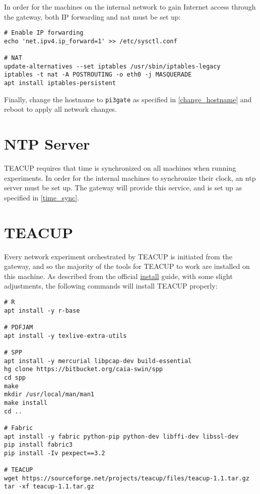 In order for the machines on the internal network to gain Internet access through the gateway, both IP forwarding and \gls{nat} must be set up:

\begin{lstlisting}
# Enable IP forwarding
echo 'net.ipv4.ip_forward=1' >> /etc/sysctl.conf

# NAT
update-alternatives --set iptables /usr/sbin/iptables-legacy
iptables -t nat -A POSTROUTING -o eth0 -j MASQUERADE
apt install iptables-persistent
\end{lstlisting}

Finally, change the hostname to \lstinline{pi3gate} as specified in \ref{change_hostname} and reboot to apply all network changes.


\section{NTP Server}

TEACUP requires that time is synchronized on all machines when running experiments. In order for the internal machines to synchronize their clock, an \gls{ntp} server must be set up. The gateway will provide this service, and is set up as specified in \ref{time_sync}.


\section{TEACUP} \label{teacup_gateway}

Every network experiment orchestrated by TEACUP is initiated from the gateway, and so the majority of the tools for TEACUP to work are installed on this machine. As described from the official \href{http://caia.swin.edu.au/tools/teacup/TEACUP-0.9_INSTALL.txt}{install} guide, with some slight adjustments, the following commands will install TEACUP properly:

\begin{lstlisting}
# R
apt install -y r-base

# PDFJAM
apt install -y texlive-extra-utils

# SPP
apt install -y mercurial libpcap-dev build-essential
hg clone https://bitbucket.org/caia-swin/spp
cd spp
make
mkdir /usr/local/man/man1
make install
cd ..

# Fabric
apt install -y fabric python-pip python-dev libffi-dev libssl-dev
pip install fabric3
pip install -Iv pexpect==3.2

# TEACUP
wget https://sourceforge.net/projects/teacup/files/teacup-1.1.tar.gz
tar -xf teacup-1.1.tar.gz
\end{lstlisting}

